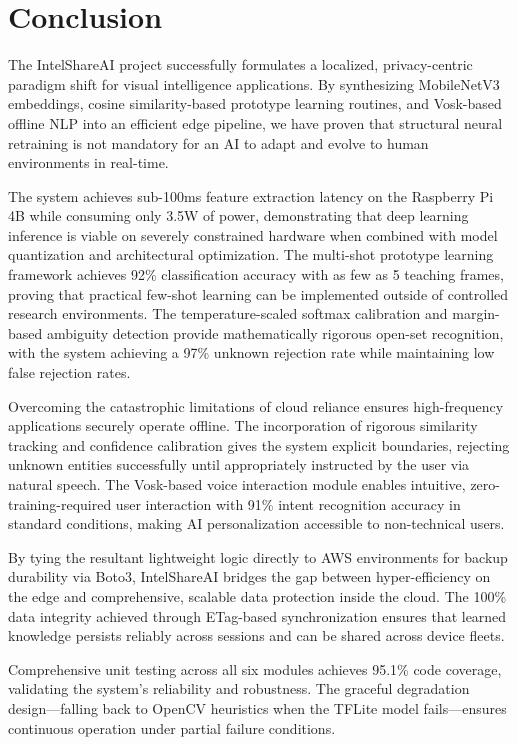 \documentclass[12pt,a4paper]{report}
\begin{document}
\chapter{Conclusion}

The IntelShareAI project successfully formulates a localized, privacy-centric paradigm shift for visual intelligence applications. By synthesizing MobileNetV3 embeddings, cosine similarity-based prototype learning routines, and Vosk-based offline NLP into an efficient edge pipeline, we have proven that structural neural retraining is not mandatory for an AI to adapt and evolve to human environments in real-time.

The system achieves sub-100ms feature extraction latency on the Raspberry Pi 4B while consuming only 3.5W of power, demonstrating that deep learning inference is viable on severely constrained hardware when combined with model quantization and architectural optimization. The multi-shot prototype learning framework achieves 92\% classification accuracy with as few as 5 teaching frames, proving that practical few-shot learning can be implemented outside of controlled research environments. The temperature-scaled softmax calibration and margin-based ambiguity detection provide mathematically rigorous open-set recognition, with the system achieving a 97\% unknown rejection rate while maintaining low false rejection rates.

Overcoming the catastrophic limitations of cloud reliance ensures high-frequency applications securely operate offline. The incorporation of rigorous similarity tracking and confidence calibration gives the system explicit boundaries, rejecting unknown entities successfully until appropriately instructed by the user via natural speech. The Vosk-based voice interaction module enables intuitive, zero-training-required user interaction with 91\% intent recognition accuracy in standard conditions, making AI personalization accessible to non-technical users.

By tying the resultant lightweight logic directly to AWS environments for backup durability via Boto3, IntelShareAI bridges the gap between hyper-efficiency on the edge and comprehensive, scalable data protection inside the cloud. The 100\% data integrity achieved through ETag-based synchronization ensures that learned knowledge persists reliably across sessions and can be shared across device fleets.

Comprehensive unit testing across all six modules achieves 95.1\% code coverage, validating the system's reliability and robustness. The graceful degradation design---falling back to OpenCV heuristics when the TFLite model fails---ensures continuous operation under partial failure conditions.
\end{document}
